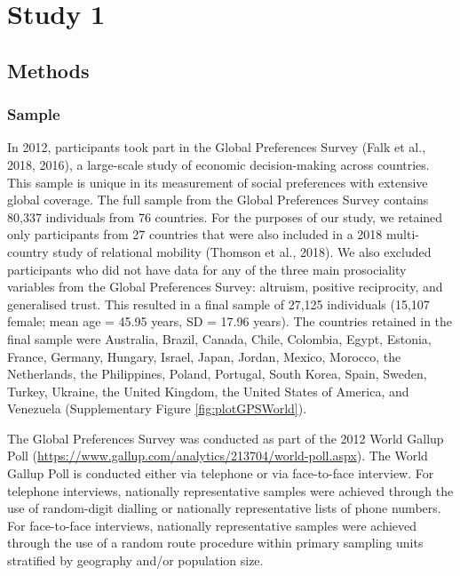 \documentclass[english,man,floatsintext]{apa6}
\begin{document}
\hypertarget{study-1}{%
\section{Study 1}\label{study-1}}

\hypertarget{methods}{%
\subsection{Methods}\label{methods}}

\hypertarget{sample}{%
\subsubsection{Sample}\label{sample}}

In 2012, participants took part in the Global Preferences Survey (Falk et al., 2018, 2016), a large-scale study of economic decision-making across countries. This sample is unique in its measurement of social preferences with extensive global coverage. The full sample from the Global Preferences Survey contains 80,337 individuals from 76 countries. For the purposes of our study, we retained only participants from 27 countries that were also included in a 2018 multi-country study of relational mobility (Thomson et al., 2018). We also excluded participants who did not have data for any of the three main prosociality variables from the Global Preferences Survey: altruism, positive reciprocity, and generalised trust. This resulted in a final sample of 27,125 individuals (15,107 female; mean age = 45.95 years, SD = 17.96 years). The countries retained in the final sample were Australia, Brazil, Canada, Chile, Colombia, Egypt, Estonia, France, Germany, Hungary, Israel, Japan, Jordan, Mexico, Morocco, the Netherlands, the Philippines, Poland, Portugal, South Korea, Spain, Sweden, Turkey, Ukraine, the United Kingdom, the United States of America, and Venezuela (Supplementary Figure \ref{fig:plotGPSWorld}).

The Global Preferences Survey was conducted as part of the 2012 World Gallup Poll (\url{https://www.gallup.com/analytics/213704/world-poll.aspx}). The World Gallup Poll is conducted either via telephone or via face-to-face interview. For telephone interviews, nationally representative samples were achieved through the use of random-digit dialling or nationally representative lists of phone numbers. For face-to-face interviews, nationally representative samples were achieved through the use of a random route procedure within primary sampling units stratified by geography and/or population size.
\end{document}
